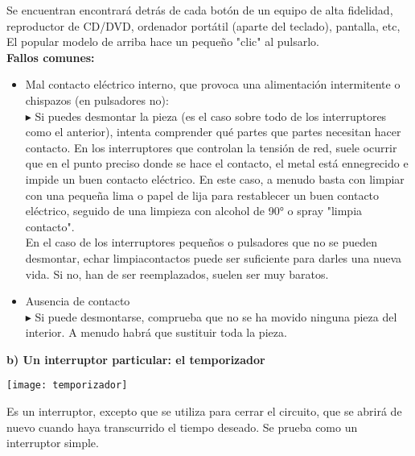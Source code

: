 Se encuentran encontrará detrás de cada botón de un equipo de alta fidelidad, reproductor de CD/DVD, ordenador portátil (aparte del teclado), pantalla, etc,
El popular modelo de arriba hace un pequeño "clic" al pulsarlo.\\

\textbf{Fallos comunes:}
\begin{itemize}
\item Mal contacto eléctrico interno, que provoca una alimentación intermitente o chispazos (en pulsadores no):
\\

$\blacktriangleright$ Si puedes desmontar la pieza (es el caso sobre todo de los interruptores como el anterior), intenta comprender qué partes que partes necesitan hacer contacto. En los interruptores que controlan la tensión de red, suele ocurrir que en el punto preciso
donde se hace el contacto, el metal está ennegrecido e impide un buen contacto eléctrico.
En este caso, a menudo basta con limpiar con una pequeña lima o papel de lija para restablecer un buen contacto eléctrico, seguido de una limpieza con alcohol de 90° o spray "limpia contacto".
\\

En el caso de los interruptores pequeños o pulsadores que no se pueden desmontar, echar limpiacontactos puede ser suficiente para darles una nueva vida. Si no, han de ser reemplazados, suelen ser muy baratos.

\item Ausencia de contacto
\\

$\blacktriangleright$ Si puede desmontarse, comprueba que no se ha movido ninguna pieza del interior.
A menudo habrá que sustituir toda la pieza.
\\
\end{itemize}
\newpage

\textbf{b) Un interruptor particular: el temporizador}

\noindent\begin{minipage}[t]{0.5\textwidth}\vspace{0pt}
\texttt{[image: temporizador]}
\end{minipage}
\hfill%
\begin{minipage}[t]{0.4\textwidth}\vspace{\fill}
\vspace{\fill} %
Es un interruptor, excepto que se utiliza para cerrar el circuito,
que se abrirá de nuevo cuando haya transcurrido el tiempo deseado.
Se prueba como un interruptor simple.
\vspace{\fill} %
\end{minipage}
\vspace{1em}

